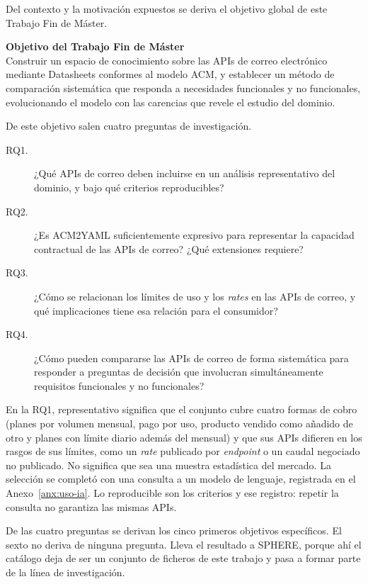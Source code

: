 Del contexto y la motivación expuestos se deriva el objetivo global de este
Trabajo Fin de Máster.

\begin{mdframed}[style=US_style]
\textbf{Objetivo del Trabajo Fin de Máster}\\[.2em]
Construir un espacio de conocimiento sobre las APIs de correo electrónico
mediante Datasheets conformes al modelo ACM, y establecer un método de comparación
sistemática que responda a necesidades funcionales y no funcionales,
evolucionando el modelo con las carencias que revele el estudio del dominio.
\end{mdframed}

De este objetivo salen cuatro preguntas de investigación.

\begin{description}
  \item[RQ1.] ¿Qué APIs de correo deben incluirse en un análisis
    representativo del dominio, y bajo qué criterios reproducibles?
  \item[RQ2.] ¿Es ACM2YAML suficientemente expresivo para representar la
    capacidad contractual de las APIs de correo? ¿Qué extensiones requiere?
  \item[RQ3.] ¿Cómo se relacionan los límites de uso y los \textit{rates}
    en las APIs de correo, y qué implicaciones tiene esa relación para el
    consumidor?
  \item[RQ4.] ¿Cómo pueden compararse las APIs de correo de forma
    sistemática para responder a preguntas de decisión que involucran
    simultáneamente requisitos funcionales y no funcionales?
\end{description}

En la RQ1, representativo significa que el conjunto cubre cuatro formas de
cobro (planes por volumen mensual, pago por uso, producto vendido como añadido
de otro y planes con límite diario además del mensual) y que sus APIs
difieren en los rasgos de sus límites, como un \textit{rate} publicado por
\textit{endpoint} o un caudal negociado no publicado. No significa que sea una
muestra estadística del mercado. La selección se completó con una consulta a
un modelo de lenguaje, registrada en el Anexo~\ref{anx:uso-ia}. Lo
reproducible son los criterios y ese registro: repetir la consulta no
garantiza las mismas APIs.

De las cuatro preguntas se derivan los cinco primeros objetivos específicos. El sexto no deriva de ninguna pregunta. Lleva el resultado a SPHERE, porque ahí el catálogo deja de ser un conjunto de ficheros de este trabajo y pasa a formar parte de la línea de investigación.

